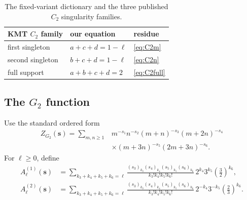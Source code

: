 \documentclass[11pt]{article}
\begin{document}
\begin{table}[ht]
\centering
\small
\begin{tabular}{@{}lll@{}}
\toprule
KMT \(C_2\) family & our equation & residue\\
\midrule
first singleton & \(a+c+d=1-\ell\) & \eqref{eq:C2m}\\
second singleton & \(b+c+d=1-\ell\) & \eqref{eq:C2n}\\
full support & \(a+b+c+d=2\) & \eqref{eq:C2full}\\
\bottomrule
\end{tabular}
\caption{The fixed-variant dictionary and the three published \(C_2\)
singularity families.}
\label{tab:C2-comparison}
\end{table}

\subsection{The \texorpdfstring{\(G_2\)}{G2} function}

Use the standard ordered form
\begin{equation}\label{eq:G2}
\begin{aligned}
 Z_{G_2}(\mathbf s)
 =\sum_{m,n\ge1}
 &m^{-s_1}n^{-s_2}(m+n)^{-s_3}(m+2n)^{-s_4}\\
 &\times(m+3n)^{-s_5}(2m+3n)^{-s_6}.
\end{aligned}
\end{equation}
For \(\ell\ge0\), define
\begin{align}
 A^{(1)}_\ell(\mathbf s)
 &=
 \sum_{k_3+k_4+k_5+k_6=\ell}
 \frac{(s_3)_{k_3}(s_4)_{k_4}(s_5)_{k_5}(s_6)_{k_6}}
      {k_3!k_4!k_5!k_6!}\,
 2^{k_4}3^{k_5}\left(\frac32\right)^{k_6},
 \label{eq:G2A1}\\
 A^{(2)}_\ell(\mathbf s)
 &=
 \sum_{k_3+k_4+k_5+k_6=\ell}
 \frac{(s_3)_{k_3}(s_4)_{k_4}(s_5)_{k_5}(s_6)_{k_6}}
      {k_3!k_4!k_5!k_6!}\,
 2^{-k_4}3^{-k_5}\left(\frac23\right)^{k_6}.
 \label{eq:G2A2}
\end{align}
\end{document}
